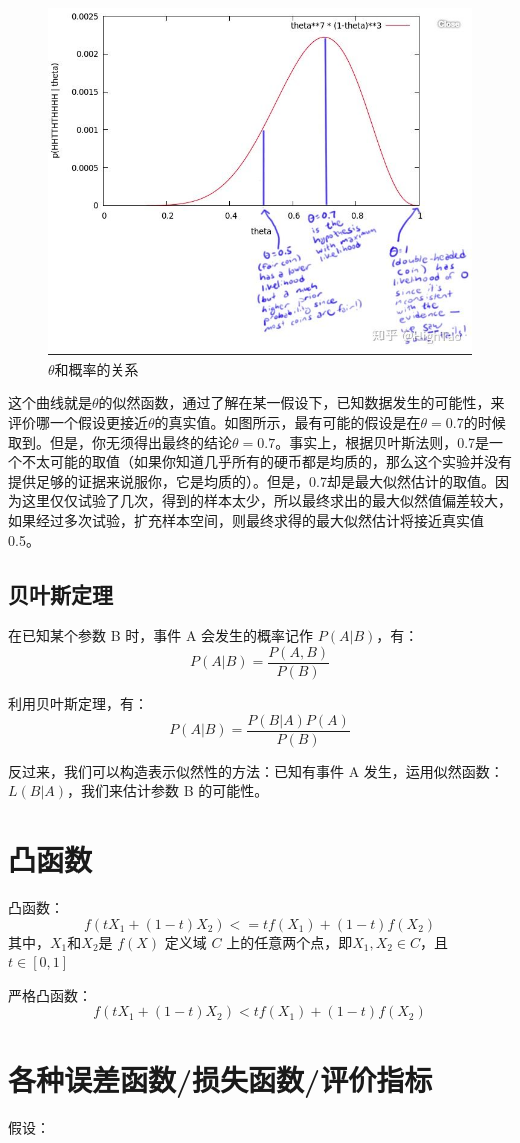 \documentclass[12pt]{article}
\begin{document}
\begin{figure}[H]
  \centering
  \includegraphics[width=.5\textwidth]{fig/Likelihood_theta_distribution.jpg} %
  \caption*{$\theta$和概率的关系} %
  \label{Likelihood_theta_distribution} %
\end{figure}

这个曲线就是$\theta$的似然函数，通过了解在某一假设下，已知数据发生的可能性，来评价哪一个假设更接近$\theta$的真实值。如图所示，最有可能的假设是在$\theta = 0.7$的时候取到。但是，你无须得出最终的结论$\theta = 0.7$。事实上，根据贝叶斯法则，0.7是一个不太可能的取值（如果你知道几乎所有的硬币都是均质的，那么这个实验并没有提供足够的证据来说服你，它是均质的）。但是，0.7却是最大似然估计的取值。因为这里仅仅试验了几次，得到的样本太少，所以最终求出的最大似然值偏差较大，如果经过多次试验，扩充样本空间，则最终求得的最大似然估计将接近真实值0.5。

\subsection{贝叶斯定理}
在已知某个参数 B 时，事件 A 会发生的概率记作 $P(A|B)$，有：
$$ P(A|B) = \frac{P(A,B)}{P(B)}$$

利用贝叶斯定理，有：
$$ P(A|B) = \frac{P(B|A)P(A)}{P(B)} $$

反过来，我们可以构造表示似然性的方法：已知有事件 A 发生，运用似然函数：$L(B|A)$，我们来估计参数 B 的可能性。

\section{凸函数}
凸函数：
$$f(tX_1 + (1-t)X_2) <= tf(X_1) + (1-t)f(X_2)$$
其中，$X_1$和$X_2$是 $f(X)$ 定义域 $C$ 上的任意两个点，即$X_1,X_2 \in C$，且 $t \in [0,1]$

严格凸函数：
$$f(tX_1 + (1-t)X_2) < tf(X_1) + (1-t)f(X_2)$$

\section{各种误差函数/损失函数/评价指标}
假设：
\end{document}

